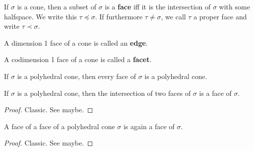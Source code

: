 \begin{definition}
  \label{1-2-5-face}
  \uses{}
  \leanok

  If $\sigma$ is a cone, then a subset of $\sigma$ is a {\bf face} iff it is the intersection of $\sigma$ with some halfspace. We write this $\tau \preceq \sigma$. If furthermore $\tau \ne \sigma$, we call $\tau$ a proper face and write $\tau \prec \sigma$.
\end{definition}


\begin{definition}
  \label{1-2-5-edge}

  A dimension 1 face of a cone is called an {\bf edge}.
\end{definition}


\begin{definition}
  \label{1-2-5-facet}

  A codimension 1 face of a cone is called a {\bf facet}.
\end{definition}


\begin{lemma}
  \label{1-2-6-face-polyhedral-cone}

  If $\sigma$ is a polyhedral cone, then every face of $\sigma$ is a polyhedral cone.
\end{lemma}


\begin{lemma}
  \label{1-2-6-inter-faces}

  If $\sigma$ is a polyhedral cone, then the intersection of two faces of $\sigma$ is a face of $\sigma$.
\end{lemma}
\begin{proof}
  \uses{}

  Classic. See \cite{Oda_1988} maybe.
\end{proof}


\begin{lemma}
  \label{1-2-6-face-face}

  A face of a face of a polyhedral cone $\sigma$ is again a face of $\sigma$.
\end{lemma}
\begin{proof}
  \uses{}

  Classic. See \cite{Oda_1988} maybe.
\end{proof}


